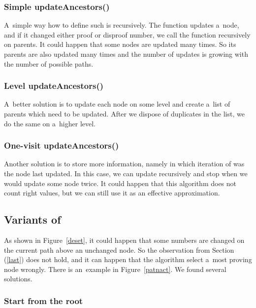 \subsubsection{Simple updateAncestors()}

A~simple way how to define such  is recursively. The
function updates a~node, and if it changed either proof or disproof
number, we call the function recursively on parents. It could happen that
some nodes are updated many times. So its parents are also updated many times
and the number of updates is growing with the number of possible paths.

\subsubsection{Level updateAncestors()}

A~better solution is to update each node on some level and create a~list of
parents which need to be updated. After we dispose of duplicates in the list,
we do the same on a~higher level. 

\subsubsection{One-visit updateAncestors()}

Another solution is to store more information, namely in which iteration of
 was the node last updated. In this case, we can update
recursively and stop when we would update some node twice. It could happen
that this algorithm does not count right values, but we can still use it as an effective 
approximation.

\subsection{Variants of }

As shown in Figure~\ref{deset}, it could happen that some numbers are changed on
the current path above an unchanged node. So the observation from Section  (\ref{last}) does not hold, and it can happen that the algorithm select a~most
proving node wrongly. There is an~example in Figure~\ref{patnact}. We found several solutions.

\subsubsection{Start from the root}


